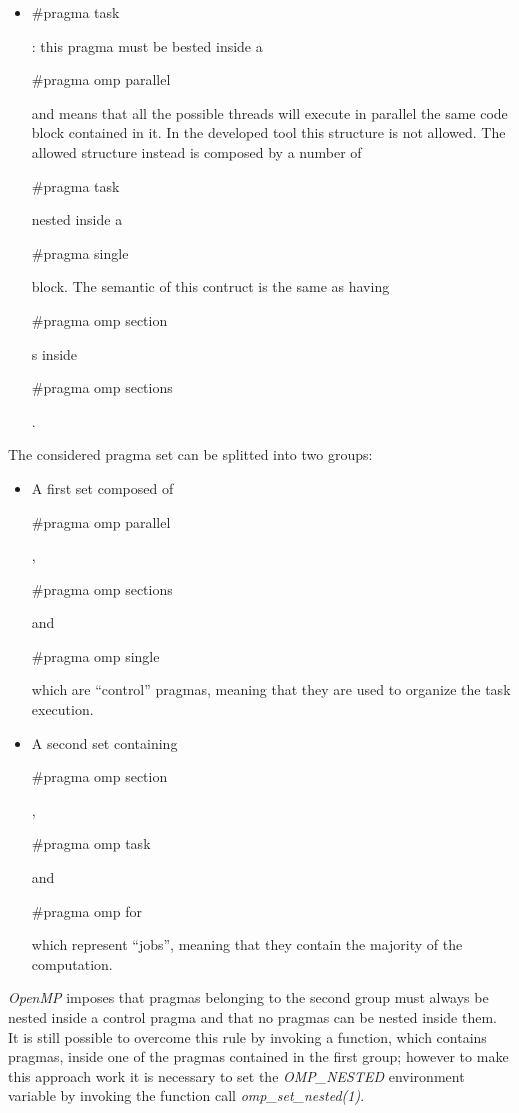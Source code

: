 \documentclass[a4paper,11pt,oneside]{book}
\begin{document}
\begin{itemize}
\item{\begin{bf}{$\#$pragma task}\end{bf} : this pragma must be bested inside a \begin{bf}{$\#$pragma omp parallel }\end{bf} and means that all the possible threads will execute in parallel the same code block contained in it. In the developed tool this structure is not allowed. The allowed structure instead is composed by a number of \begin{bf}{$\#$pragma task}\end{bf} nested inside a \begin{bf}{$\#$pragma single}\end{bf} block. The semantic of this contruct is the same as  having \begin{bf}{$\#$pragma omp section}\end{bf}s inside \begin{bf}{$\#$pragma omp sections}\end{bf}.}
\end{itemize}

The considered pragma set can be splitted into two groups: 
\begin{itemize}
\item{ A first set composed of \begin{bf}{$\#$pragma omp parallel}\end{bf}, \begin{bf}{$\#$pragma omp sections}\end{bf} and \begin{bf}{ $\#$pragma omp single}\end{bf} which are “control” pragmas, meaning that they are used to organize the task execution.}
\item{A second set containing \begin{bf}{$\#$pragma omp section}\end{bf}, \begin{bf}{$\#$pragma omp task}\end{bf} and \begin{bf}{$\#$pragma omp for}\end{bf} which represent “jobs”, meaning that they contain the majority of the computation.}
\end{itemize}

 \emph{OpenMP} imposes that pragmas belonging to the second group must always be nested inside a control pragma and that no pragmas can be nested inside them. It is still possible to overcome this rule by invoking a function, which contains pragmas, inside one of the pragmas contained in the first group; however to make this approach work it is necessary to set the \emph{OMP\_NESTED} environment variable by invoking the function call \emph{omp\_set\_nested(1)}.
\end{document}
